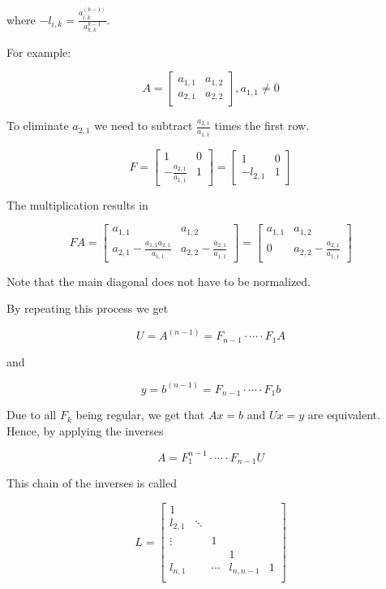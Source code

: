where \(-l_{i,k} = \frac{a_{i,k}^{(k - 1)}}{a_{k,k}^{k - 1}}\). 

For example: 

\[
    A = 
    \begin{bmatrix}
        a_{1,1} & a_{1,2} \\ 
        a_{2,1} & a_{2,2}
    \end{bmatrix}
    ,
    a_{1,1} \ne 0
\]

To eliminate \(a_{2,1}\) we need to subtract \(\frac{a_{2,1}}{a_{1,1}}\) times the first row.

\[
    F = 
    \begin{bmatrix}
        1 & 0 \\ 
       - \frac{a_{2,1}}{a_{1,1}} & 1
    \end{bmatrix}
    = 
    \begin{bmatrix}
        1 & 0 \\ 
        - l_{2,1} & 1
    \end{bmatrix}
\]

The multiplication results in

\[
    FA = 
    \begin{bmatrix}
        a_{1,1} & a_{1,2} \\ 
        a_{2,1}  - \frac{a_{1,1}a_{2,1}}{a_{1,1}} & a_{2,2} - \frac{a_{2,1}}{a_{1,1}}
    \end{bmatrix}
    = 
    \begin{bmatrix}
        a_{1,1} & a_{1,2} \\ 
        0 & a_{2,2} - \frac{a_{2,1}}{a_{1,1}}
    \end{bmatrix}
\]

Note that the main diagonal does not have to be normalized.

By repeating this process we get 

\[
    U = A^{(n - 1)} = F_{n - 1} \cdot \cdots \cdot F_1 A
\]

and 

\[
    y = b^{(n - 1)} = F_{n - 1} \cdot \cdots \cdot F_1 b
\]

Due to all \(F_k\) being regular, we get that \(Ax = b\) and \(Ux = y\) are equivalent.
Hence, by applying the inverses 

\[
    A = F_{1}^{n - 1} \cdot \cdots \cdot F_{n - 1} U
\]

This chain of the inverses is called 

\[
    L = 
    \begin{bmatrix}
        1 &        &         &   &        \\
        l_{2,1}  & \ddots &         &   &        \\
        \vdots &        & 1       &   &        \\
          &        &  & 1 &        \\
        l_{n,1} &        &  \cdots      &  l_{n,n-1} & 1 \\
    \end{bmatrix}
\]

